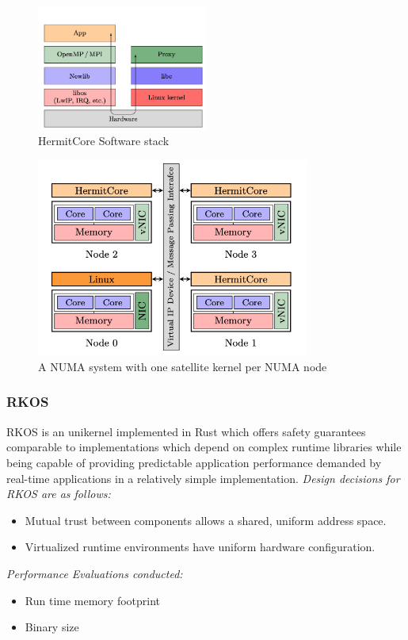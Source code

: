 \begin{figure}[htbp!] 
  \centering    
  \includegraphics[width=0.5\textwidth]{HermitCoreStack}
  \caption[HermitCore]{HermitCore Software stack \cite{HermitCore}}
  \label{fig:HermitCoreStack}
  \end{figure}

  \begin{figure}[htbp!] 
    \centering    
    \includegraphics[width=0.8\textwidth]{NumaHermitCore}
    \caption[HermitCore]{A NUMA system with one satellite kernel per NUMA node \cite{HermitCore}}
    \label{fig:HermitCoreStack}
    \end{figure}



\subsubsection{RKOS \cite{RKOS}}
RKOS is an unikernel implemented in Rust which
offers safety guarantees comparable to implementations which depend on complex runtime
libraries while being capable of providing predictable application performance demanded
by real-time applications in a relatively simple implementation. 
\emph{Design decisions for RKOS are as follows:}
\begin{itemize}
  \item Mutual trust between components allows a shared, uniform address space.
  \item Virtualized runtime environments have uniform hardware configuration.
\end{itemize}
\emph{Performance Evaluations conducted:}
\begin{itemize}
  \item Run time memory footprint 
  \item Binary size 
\end{itemize}

